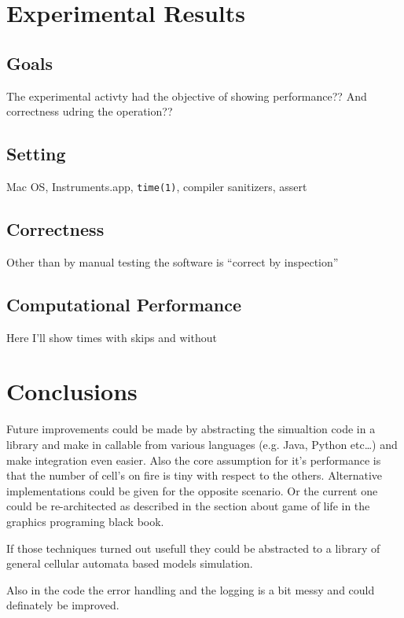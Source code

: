 \documentclass[draft]{article}
\begin{document}
\section{Experimental Results}\label{sec:experimental_results}


\subsection{Goals}\label{sec:goals}

The experimental activty had the objective of showing performance?? And
correctness udring the operation??

\subsection{Setting}\label{sec:setting}

Mac OS, Instruments.app, \texttt{time(1)}, compiler sanitizers, assert

\subsection{Correctness}\label{sec:correctness}

Other than by manual testing the software is ``correct by inspection''

\subsection{Computational Performance}\label{sec:computational_performance}

Here I'll show times with skips and without

\section{Conclusions}\label{sec:conclusions}

Future improvements could be made by abstracting the simualtion code in a
library and make in callable from various languages (e.g. Java, Python etc\dots)
and make integration even easier. Also the core assumption for it's performance
is that the number of cell's on fire is tiny with respect to the others.
Alternative implementations could be given for the opposite scenario. Or the
current one could be re-architected as described in the section about game of
life in the graphics programing black book.

If those techniques turned out usefull they could be abstracted to a library of
general cellular automata based models simulation.

Also in the code the error handling and the logging is a bit messy and could
definately be improved.



\end{document}
